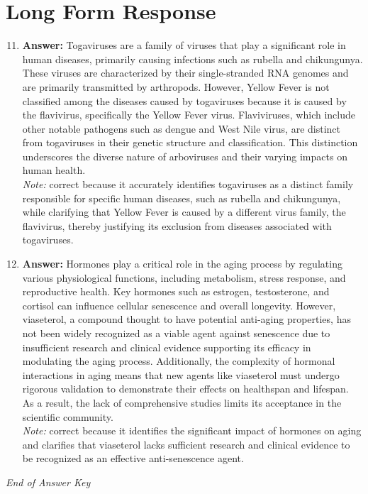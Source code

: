 \documentclass[12pt]{article}
\begin{document}
\section*{Long Form Response}
\begin{enumerate}[label=\arabic*.]
\setcounter{enumi}{10}
\item \textbf{Answer:} Togaviruses are a family of viruses that play a significant role in human diseases, primarily causing infections such as rubella and chikungunya. These viruses are characterized by their single-stranded RNA genomes and are primarily transmitted by arthropods. However, Yellow Fever is not classified among the diseases caused by togaviruses because it is caused by the flavivirus, specifically the Yellow Fever virus. Flaviviruses, which include other notable pathogens such as dengue and West Nile virus, are distinct from togaviruses in their genetic structure and classification. This distinction underscores the diverse nature of arboviruses and their varying impacts on human health.
\\ \textit{Note:} correct because it accurately identifies togaviruses as a distinct family responsible for specific human diseases, such as rubella and chikungunya, while clarifying that Yellow Fever is caused by a different virus family, the flavivirus, thereby justifying its exclusion from diseases associated with togaviruses.
\item \textbf{Answer:} Hormones play a critical role in the aging process by regulating various physiological functions, including metabolism, stress response, and reproductive health. Key hormones such as estrogen, testosterone, and cortisol can influence cellular senescence and overall longevity. However, viaseterol, a compound thought to have potential anti-aging properties, has not been widely recognized as a viable agent against senescence due to insufficient research and clinical evidence supporting its efficacy in modulating the aging process. Additionally, the complexity of hormonal interactions in aging means that new agents like viaseterol must undergo rigorous validation to demonstrate their effects on healthspan and lifespan. As a result, the lack of comprehensive studies limits its acceptance in the scientific community.
\\ \textit{Note:} correct because it identifies the significant impact of hormones on aging and clarifies that viaseterol lacks sufficient research and clinical evidence to be recognized as an effective anti-senescence agent.
\end{enumerate}

\vfill
\noindent\textit{End of Answer Key}
\end{document}
